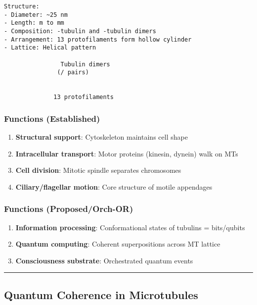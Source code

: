 \begin{verbatim}
Structure:
- Diameter: ~25 nm
- Length: m to mm
- Composition: -tubulin and -tubulin dimers
- Arrangement: 13 protofilaments form hollow cylinder
- Lattice: Helical pattern

                Tubulin dimers
               (/ pairs)
        
       
              13 protofilaments
\end{verbatim}

\subsubsection{Functions (Established)}\label{functions-established}

\begin{enumerate}
\def\labelenumi{\arabic{enumi}.}
\tightlist
\item
  \textbf{Structural support}: Cytoskeleton maintains cell shape
\item
  \textbf{Intracellular transport}: Motor proteins (kinesin, dynein)
  walk on MTs
\item
  \textbf{Cell division}: Mitotic spindle separates chromosomes
\item
  \textbf{Ciliary/flagellar motion}: Core structure of motile appendages
\end{enumerate}

\subsubsection{Functions
(Proposed/Orch-OR)}\label{functions-proposedorch-or}

\begin{enumerate}
\def\labelenumi{\arabic{enumi}.}
\setcounter{enumi}{4}
\tightlist
\item
  \textbf{Information processing}: Conformational states of tubulins =
  bits/qubits
\item
  \textbf{Quantum computing}: Coherent superpositions across MT lattice
\item
  \textbf{Consciousness substrate}: Orchestrated quantum events
\end{enumerate}

\begin{center}\rule{0.5\linewidth}{0.5pt}\end{center}

\subsection{Quantum Coherence in
Microtubules}\label{quantum-coherence-in-microtubules}

